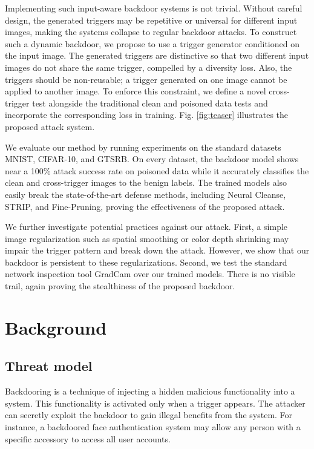 Implementing such input-aware backdoor systems is not trivial. Without careful design, the generated triggers may be repetitive or universal for different input images, making the systems collapse to regular backdoor attacks. To construct such a dynamic backdoor, we propose to use a trigger generator conditioned on the input image. The generated triggers are distinctive so that two different input images do not share the same trigger, compelled by a diversity loss. Also, the triggers should be non-reusable; a trigger generated on one image cannot be applied to another image. To enforce this constraint, we define a novel cross-trigger test alongside the traditional clean and poisoned data tests and incorporate the corresponding loss in training. Fig. \ref{fig:teaser} illustrates the proposed attack system.

We evaluate our method by running experiments on the standard datasets MNIST, CIFAR-10, and GTSRB. On every dataset, the backdoor model shows near a 100\% attack success rate on poisoned data while it accurately classifies the clean and cross-trigger images to the benign labels. The trained models also easily break the state-of-the-art defense methods, including Neural Cleanse, STRIP, and Fine-Pruning, proving the effectiveness of the proposed attack.

We further investigate potential practices against our attack. First, a simple image regularization such as spatial smoothing or color depth shrinking may impair the trigger pattern and break down the attack. However, we show that our backdoor is persistent to these regularizations. Second, we test the standard network inspection tool GradCam \cite{selvaraju2017grad} over our trained models. There is no visible trail, again proving the stealthiness of the proposed backdoor.

\section{Background}
\subsection{Threat model}
Backdooring is a technique of injecting a hidden malicious functionality into a system. This functionality is activated only when a trigger appears. The attacker can secretly exploit the backdoor to gain illegal benefits from the system. For instance, a backdoored face authentication system may allow any person with a specific accessory to access all user accounts.

